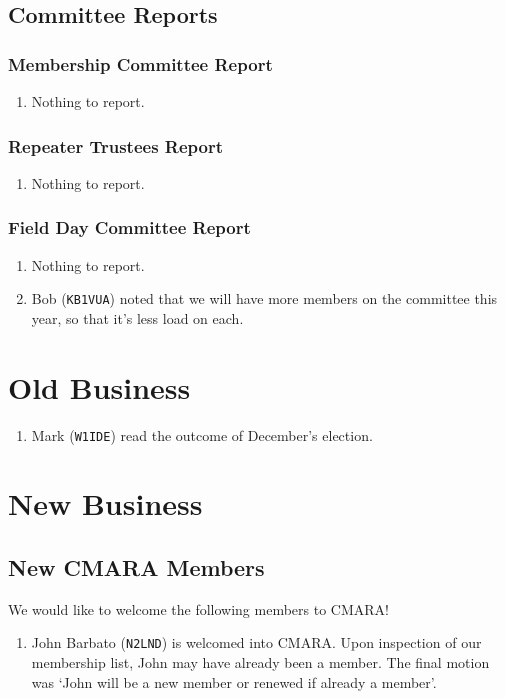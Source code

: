 \documentclass[10pt,letterpaper]{article}
\begin{document}
\subsection{Committee Reports}

\subsubsection{Membership Committee Report}
\begin{enumerate}
  \item Nothing to report.
\end{enumerate}

\subsubsection{Repeater Trustees Report}
\begin{enumerate}
  \item Nothing to report.
\end{enumerate}

\subsubsection{Field Day Committee Report}
\begin{enumerate}
  \item Nothing to report.
  \item Bob (\texttt{KB1VUA}) noted that we will have more members on the committee this year, so that it's less load on each.
\end{enumerate}

\section{Old Business}
\begin{enumerate}
  \item Mark (\texttt{W1IDE}) read the outcome of December's election.
\end{enumerate}

\section{New Business}

\subsection{New CMARA Members}
\label{new-cmara-members}
We would like to welcome the following members to CMARA!
\begin{enumerate}
  \item John Barbato (\texttt{N2LND}) is welcomed into CMARA. Upon inspection of our membership list, John may have already been a member. The final motion was `John will be a new member or renewed if already a member'.
\end{enumerate}
\end{document}
